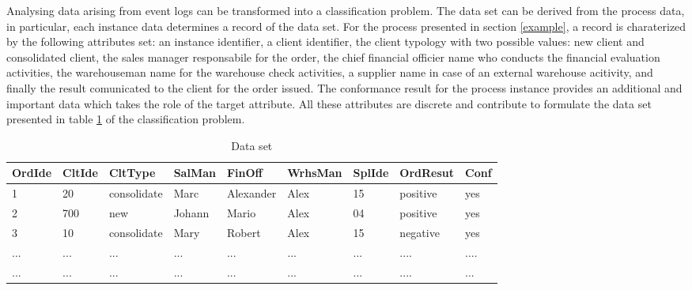 \documentclass[11pt]{article}
\begin{document}
Analysing data arising from event logs can be transformed into a classification problem. The data set can be derived from the process data, in particular, each instance data determines a record of the data set. For the process presented in section \ref{example}, a record is charaterized by the following attributes set: an instance identifier, a client identifier, the client typology with two possible values: new client and consolidated client, the sales manager responsabile for the order, the chief financial officier name who conducts the financial evaluation activities, the warehouseman name for the warehouse check activities, a supplier name in case of an external warehouse acitivity, and finally the result comunicated to the client for the order issued. The conformance result for the process instance provides an additional and important data which takes the role of the target attribute. All these attributes are discrete and contribute to formulate the data set presented in table \ref{tab:SaleData} of the classification problem.\\

\begin{table}[!h]
\scriptsize
\centering
\begin{tabular}{|p{}|p{}|p{}|p{}|p{}|p{}|p{0.8cm}|p{}|p{}|}
\hline OrdIde & CltIde & CltType & SalMan & FinOff & WrhsMan & SplIde & OrdResut & Conf\\
\hline
1 & 20 & consolidate & Marc & Alexander & Alex & 15 & positive & yes\\
\hline
2 & 700 & new & Johann & Mario & Alex & 04 & positive & yes\\
\hline
3 & 10 &consolidate & Mary & Robert & Alex & 15 & negative & yes\\
\hline
... & ... & ... & ... & ... & ... & ... & .... & .... \\
\hline
... & ... & ... & ... & ... & ... & ... & .... & ...  \\
\hline
\end{tabular}
\scriptsize
\caption{Data set}
\label{tab:SaleData}
\end{table}
\normalsize
\end{document}
